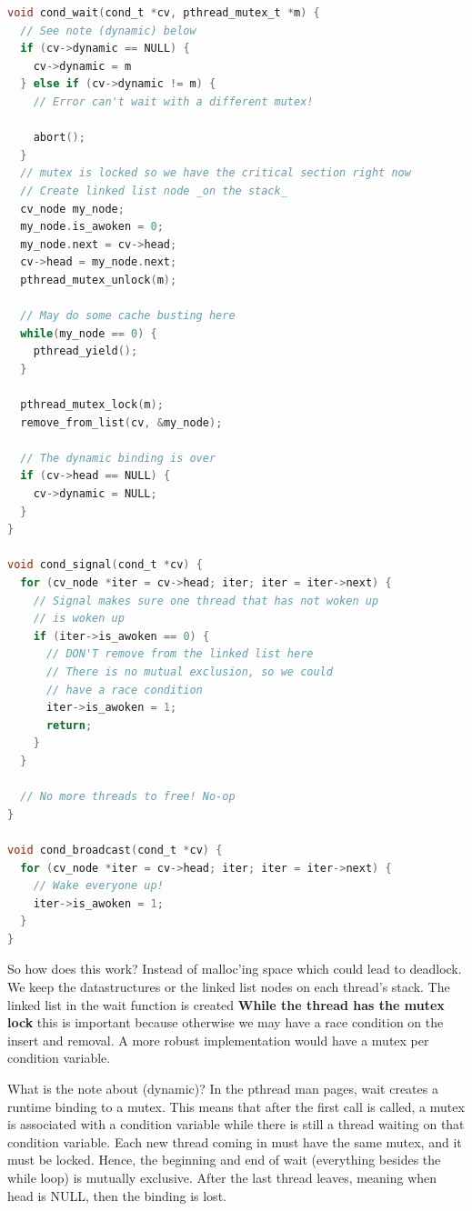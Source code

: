 \begin{lstlisting}[language=C]
void cond_wait(cond_t *cv, pthread_mutex_t *m) {
  // See note (dynamic) below
  if (cv->dynamic == NULL) {
    cv->dynamic = m
  } else if (cv->dynamic != m) {
    // Error can't wait with a different mutex!

    abort();
  }
  // mutex is locked so we have the critical section right now
  // Create linked list node _on the stack_
  cv_node my_node;
  my_node.is_awoken = 0;
  my_node.next = cv->head;
  cv->head = my_node.next;
  pthread_mutex_unlock(m);

  // May do some cache busting here
  while(my_node == 0) {
    pthread_yield();
  }

  pthread_mutex_lock(m);
  remove_from_list(cv, &my_node);

  // The dynamic binding is over
  if (cv->head == NULL) {
    cv->dynamic = NULL;
  }
}

void cond_signal(cond_t *cv) {
  for (cv_node *iter = cv->head; iter; iter = iter->next) {
    // Signal makes sure one thread that has not woken up
    // is woken up
    if (iter->is_awoken == 0) {
      // DON'T remove from the linked list here
      // There is no mutual exclusion, so we could
      // have a race condition
      iter->is_awoken = 1;
      return;
    }
  }

  // No more threads to free! No-op
}

void cond_broadcast(cond_t *cv) {
  for (cv_node *iter = cv->head; iter; iter = iter->next) {
    // Wake everyone up!
    iter->is_awoken = 1;
  }
}
\end{lstlisting}

So how does this work?
Instead of malloc'ing space which could lead to deadlock.
We keep the datastructures or the linked list nodes on each thread's stack.
The linked list in the wait function is created \textbf{While the thread has the mutex lock} this is important because otherwise we may have a race condition on the insert and removal.
A more robust implementation would have a mutex per condition variable.

What is the note about (dynamic)?
In the pthread man pages, wait creates a runtime binding to a mutex. This means that after the first call is called, a mutex is associated with a condition variable while there is still a thread waiting on that condition variable.
Each new thread coming in must have the same mutex, and it must be locked.
Hence, the beginning and end of wait (everything besides the while loop) is mutually exclusive.
After the last thread leaves, meaning when head is NULL, then the binding is lost.

